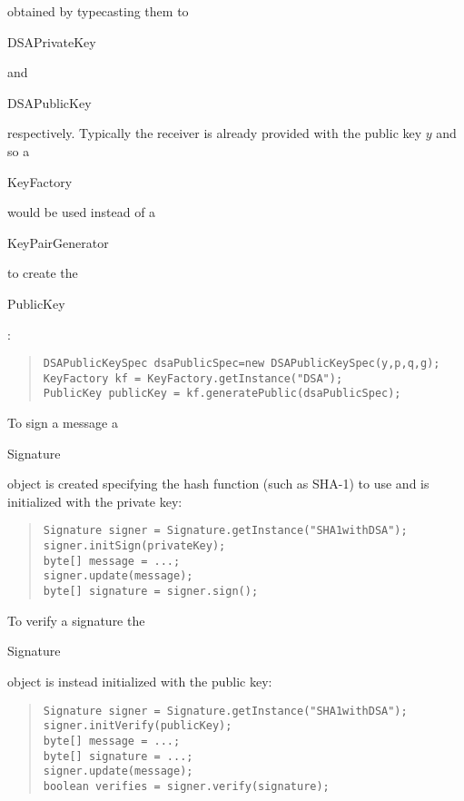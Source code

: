 obtained by typecasting them to \begin{code}DSAPrivateKey\end{code}
and \begin{code}DSAPublicKey\end{code} respectively.
Typically the receiver is already provided with the public key $y$
and so a \begin{code}KeyFactory\end{code} would be used instead of a
\begin{code}KeyPairGenerator\end{code} to create the \begin{code}PublicKey\end{code}:
\begin{quote}\begin{code}\begin{verbatim}
DSAPublicKeySpec dsaPublicSpec=new DSAPublicKeySpec(y,p,q,g);
KeyFactory kf = KeyFactory.getInstance("DSA");
PublicKey publicKey = kf.generatePublic(dsaPublicSpec);
\end{verbatim}\end{code}\end{quote}

To sign a message a \begin{code}Signature\end{code} object is created
specifying the hash function (such as SHA-1) to use and is
initialized with the private key:
\begin{quote}\begin{code}\begin{verbatim}
Signature signer = Signature.getInstance("SHA1withDSA");
signer.initSign(privateKey);
byte[] message = ...;
signer.update(message);
byte[] signature = signer.sign();
\end{verbatim}\end{code}\end{quote}
To verify a signature the \begin{code}Signature\end{code} object is
instead initialized with the public key:
\begin{quote}\begin{code}\begin{verbatim}
Signature signer = Signature.getInstance("SHA1withDSA");
signer.initVerify(publicKey);
byte[] message = ...;
byte[] signature = ...;
signer.update(message);
boolean verifies = signer.verify(signature);
\end{verbatim}\end{code}\end{quote}

